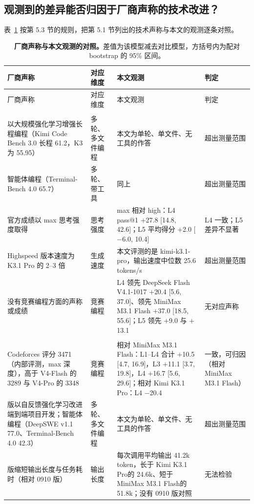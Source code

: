 \documentclass[11pt,a4paper,fontset=none]{ctexart}
\newcommand{\kimi}{Kimi K3.1 Pro}
\newcommand{\mini}{MiniMax M3.1 Flash}
\newcommand{\ds}{DeepSeek Flash V4.1-1017}
\begin{document}
\subsection{观测到的差异能否归因于厂商声称的技术改进？}

表~\ref{tab:attr} 按第 5.3 节的规则，把第 5.1 节列出的技术声称与本文的观测逐条对照。

{\small
\begin{longtable}{@{}>{\raggedright\arraybackslash}p{4.0cm}>{\raggedright\arraybackslash}p{1.6cm}>{\raggedright\arraybackslash}p{6.9cm}>{\raggedright\arraybackslash}p{2.2cm}@{}}
  \caption{\textbf{厂商声称与本文观测的对照。}差值为该模型减去对比模型，方括号内为配对 bootstrap 的 95\% 区间。}\label{tab:attr}\\
    \toprule
    厂商声称 & 对应维度 & 本文观测 & 判定 \\
    \midrule
    \endfirsthead
    \toprule
    厂商声称 & 对应维度 & 本文观测 & 判定 \\
    \midrule
    \endhead
    \multicolumn{4}{@{}l}{\textbf{\kimi}} \\
    以大规模强化学习增强长程编程（Kimi Code Bench 3.0 长程 61.2，K3 为 55.95） & 多轮、多文件编程 & 本文为单轮、单文件、无工具的作答 & 超出测量范围 \\
    智能体编程（Terminal-Bench 4.0 65.7） & 多轮、带工具 & 同上 & 超出测量范围 \\
    官方成绩以 max 思考强度取得 & 思考强度 & max 相对 high：L4 pass@1 $+$27.8 [14.8, 42.6]；L5 平均得分 $+$2.0 [$-$6.0, 10.4] & L4 一致；L5 差异不显著 \\
    Highspeed 版本速度为 K3.1 Pro 的 2--3 倍 & 生成速度 & 本文评测的是 kimi-k3.1-pro，输出速度中位数 25.6 tokens/s & 超出测量范围 \\
    没有竞赛编程方面的声称或成绩 & 竞赛编程 & L4 领先 \ds{} $+$20.4 [5.6, 37.0]、领先 \mini{} $+$37.0 [18.5, 55.6]；L5 领先 $+$9.0 与 $+$13.1 & 无对应声称 \\
    \midrule
    \multicolumn{4}{@{}l}{\textbf{\ds}} \\
    Codeforces 评分 3471（内部评测，max 深度），高于 V4-Flash 的 3289 与 V4-Pro 的 3348 & 竞赛编程 & 相对 \mini：L1--L4 合计 $+$10.5 [4.7, 16.9]，L3 $+$11.1 [3.7, 19.8]，L4 $+$16.7 [5.6, 29.6]；相对 \kimi：L4 $-$20.4 & 一致，可归因（相对 \mini） \\
    1017 版以自反馈强化学习改进端到端项目开发；智能体编程（DeepSWE v1.1 77.0、Terminal-Bench 4.0 42.3） & 多轮、多文件编程 & 本文为单轮、单文件、无工具的作答 & 超出测量范围 \\
    1017 版缩短输出长度与任务耗时（相对 0910 版） & 输出长度 & 每次调用平均输出 41.2k token，长于 \kimi 的 24.6k、短于 \mini 的 51.8k；没有 0910 版对照 & 无法检验 \\

\end{longtable}}
\end{document}
